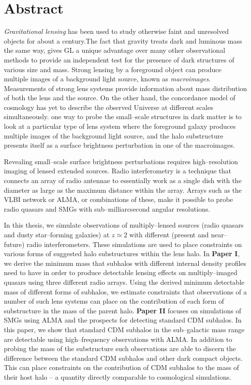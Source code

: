 \documentclass[a4wide,12pt]{book}
\newcommand{\ignore}[1]{}
\begin{document}
{\chapter*{Abstract}
\thispagestyle{empty}
\emph{Gravitational lensing} has been used to study otherwise faint and unresolved objects for about a century.The fact that gravity treats dark and luminous mass the same way, gives GL a unique advantage over many other observational methods to provide an independent test for the presence of dark structures of various size and mass. Strong lensing by a foreground object can produce multiple images of a background light source, known as \emph{macroimages}. Measurements of strong lens systems provide information about mass distribution of both the lens and the source. On the other hand, the concordance model of cosmology\ignore{ -- accounting for dark matter as the second abundant component in the Universe --} has yet to describe the observed Universe at different scales simultaneously. one way to probe the small--scale structures in dark matter is to look at a particular type of lens system where the foreground galaxy produces multiple images of the background light source, and the halo substructure presents itself as a surface brightness perturbation in one of the macroimages.

Revealing small--scale surface brightness perturbations requires high--resolution imaging of lensed extended sources. Radio interferometry is a technique that connects an array of radio antennae to essentially work as a single dish with the diameter as large as the maximum distance within the array. Arrays such as the VLBI network or ALMA, or combinations of these, make it possible to probe radio quasars and SMGs with sub--milliarcsecond angular resolutions.

In this thesis, we simulate observations of multiply--lensed sources (radio quasars and dusty star--forming galaxies) at $z \simeq 2$ with different (present and near--future) radio interferometers. These simulations are used to place constraints on various forms of suggested halo substructures within the lens halo. In {\bf Paper I}, we derive the minimum  mass that subhalos with different internal density profiles need to have in order to produce detectable lensing effects on multiply--imaged quasars using three different radio arrays. Using the derived minimum detectable mass of different forms of subhalos, we estimate constraints that observations of a number of such lens systems can place on the contribution of each form of substructure in the mass of the parent halo. {\bf Paper II} focuses on simulations of SMGs using ALMA and the prospects for detecting standard CDM subhalos. In this paper, we show that standard CDM subhalos in the sub--galactic mass range are detectable using high--frequency observations with ALMA. In addition to probing the mass of the substructure such observations are able to discern the difference between the standard CDM subhalos and other dark compact objects.  This can place constraints on the contribution of CDM subhalos to the mass of their host halo -- a quantity directly comparable to cosmological simulations.


}
\end{document}
